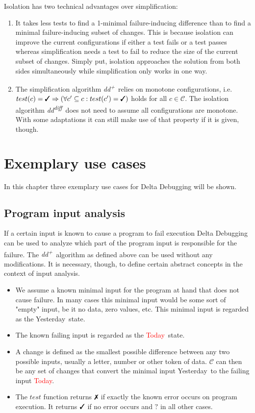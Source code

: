 \documentclass[a4paper,UKenglish]{lipics-v2018}
\newcommand{\ddp}{\textit{dd\textsuperscript{+}}}
\newcommand{\dddiff}{\textit{dd\textsuperscript{diff}}}
\newcommand{\green}[1]{\textcolor{td-green}{#1}}
\newcommand{\red}[1]{\textcolor{red}{#1}}
\newcommand{\yd}[0]{\green{Yesterday}}
\newcommand{\td}[0]{\red{Today}}
\newcommand{\C}[0]{\ensuremath{\mathcal{C}}}
\newcommand{\cmark}{\text{\ding{51}}}
\newcommand{\xmark}{\text{\ding{55}}}
\newcommand{\qmark}{\textbf{?}}
\begin{document}
Isolation has two technical advantages over simplification:
\begin{enumerate}
	\item It takes less tests to find a 1-minimal failure-inducing difference than to find a minimal failure-inducing subset of changes. %
	This is because isolation can improve the current configurations if either a test fails or a test passes whereas simplification needs a test to fail to reduce the size of the current subset of changes. Simply put, isolation approaches the solution from both sides simultaneously while simplification only works in one way.
	\item The simplification algorithm \ddp\ relies on monotone configurations, i.e. $test(c)=\cmark \Rightarrow (\forall c' \subseteq c : test(c') = \cmark)$ holds for all $c \in \C$. The isolation algorithm \dddiff\ does not need to assume all configurations are monotone. With some adaptations it can still make use of that property if it is given, though. %
\end{enumerate}

\section{Exemplary use cases}

In this chapter three exemplary use cases for Delta Debugging will be shown.

\subsection{Program input analysis}

If a certain input is known to cause a program to fail execution Delta Debugging can be used to analyze which part of the program input is responsible for the failure. The \ddp\ algorithm as defined above can be used without any modifications. It is necessary, though, to define certain abstract concepts in the context of input analysis.\\
\begin{itemize}
  	\item We assume a known minimal input for the program at hand that does not cause failure. In many cases this minimal input would be some sort of "empty" input, be it no data, zero values, etc. This minimal input is regarded as the \yd\ state.
  	\item The known failing input is regarded as the \td\ state.
  	\item A change is defined as the smallest possible difference between any two possible inputs, usually a letter, number or other token of data. $\C$ can then be any set of changes that convert the minimal input \yd\ to the failing input \td.
  	\item The $test$ function returns $\xmark$ if exactly the known error occurs on program execution. It returns $\cmark$ if no error occurs and $\qmark$ in all other cases. 
\end{itemize}
\end{document}
